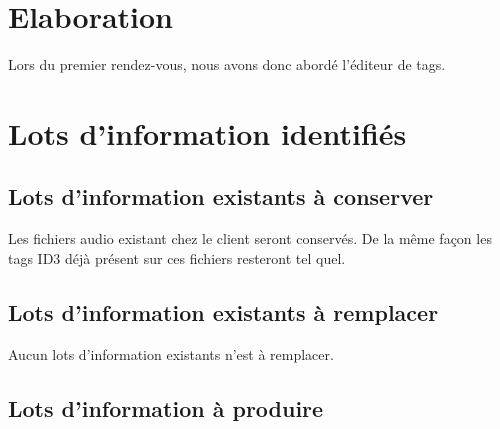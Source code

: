 \documentclass[a4paper,12pt]{report}
\begin{document}

\section{Elaboration}


Lors du premier rendez-vous, nous avons donc abordé l'éditeur de tags.

\section{Lots d'information identifiés}

\subsection{Lots d'information existants à conserver}

Les fichiers audio existant chez le client seront conservés. De la même façon les tags ID3 déjà présent sur ces fichiers resteront tel quel. 

\subsection{Lots d'information existants à remplacer}

Aucun lots d'information existants n'est à remplacer.

\subsection{Lots d'information à produire}
 
\end{document}
